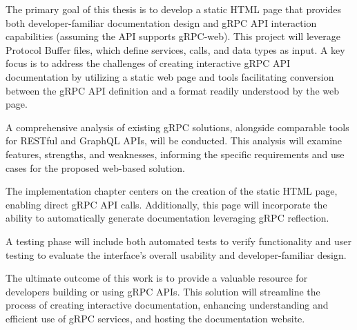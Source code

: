 The primary goal of this thesis is to develop a static HTML page that provides both developer-familiar documentation design and gRPC API interaction capabilities (assuming the API supports gRPC-web).
This project will leverage Protocol Buffer files, which define services, calls, and data types as input.
A key focus is to address the challenges of creating interactive gRPC API documentation by utilizing a static web page and tools facilitating conversion between the gRPC API definition and a format readily understood by the web page.

A comprehensive analysis of existing gRPC solutions, alongside comparable tools for RESTful and GraphQL APIs, will be conducted.
This analysis will examine features, strengths, and weaknesses, informing the specific requirements and use cases for the proposed web-based solution.

The implementation chapter centers on the creation of the static HTML page, enabling direct gRPC API calls.
Additionally, this page will incorporate the ability to automatically generate documentation leveraging gRPC reflection.

A testing phase will include both automated tests to verify functionality and user testing to evaluate the interface's overall usability and developer-familiar design.

The ultimate outcome of this work is to provide a valuable resource for developers building or using gRPC APIs.
This solution will streamline the process of creating interactive documentation, enhancing understanding and efficient use of gRPC services, and hosting the documentation website.